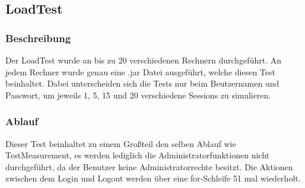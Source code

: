 \subsection{LoadTest}

\subsubsection{Beschreibung}

Der LoadTest wurde an bis zu 20 verschiedenen Rechnern durchgeführt. An jedem Rechner wurde genau eine .jar Datei ausgeführt, welche diesen Test beinhaltet. Dabei unterscheiden sich die Tests nur beim Beutzernamen und Passwort, um jeweils 1, 5, 15 und 20 
verschiedene Sessions zu simulieren.

\subsubsection{Ablauf}

Dieser Test beinhaltet zu einem Großteil den selben Ablauf wie TestMeasurement, es werden lediglich die Administratorfunktionen nicht durchgeführt, da der Benutzer keine Administratorrechte besitzt. Die Aktionen zwischen dem Login und Logout werden über eine for-Schleife 51 mal wiederholt.

